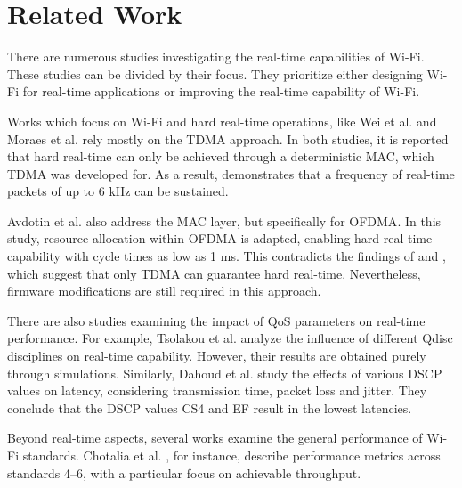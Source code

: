 \chapter{Related Work} \label{sec:related}

There are numerous studies investigating the real-time capabilities of Wi-Fi.  
These studies can be divided by their focus.
They prioritize either designing Wi-Fi for real-time applications or improving the real-time capability of Wi-Fi.

Works which focus on Wi-Fi and hard real-time operations, like Wei et al. \cite{6728869} and Moraes et al. \cite{4638758} rely mostly on the \ac{TDMA} approach.  
In both studies, it is reported that hard real-time can only be achieved through a deterministic \ac{MAC}, which \ac{TDMA} was developed for.  
As a result, \cite{6728869} demonstrates that a frequency of real-time packets of up to 6 kHz can be sustained.  

Avdotin et al. \cite{Avdotin_2019} also address the \ac{MAC} layer, but specifically for \ac{OFDMA}.  
In this study, resource allocation within \ac{OFDMA} is adapted, enabling hard real-time capability with cycle times as low as 1 ms.  
This contradicts the findings of \cite{6728869} and \cite{4638758}, which suggest that only \ac{TDMA} can guarantee hard real-time.  
Nevertheless, firmware modifications are still required in this approach.  

There are also studies examining the impact of \ac{QoS} parameters on real-time performance.  
For example, Tsolakou et al. \cite{Tsolakou_2002s} analyze the influence of different \ac{Qdisc} disciplines on real-time capability.  
However, their results are obtained purely through simulations.  
Similarly, Dahoud et al. \cite{da_2019} study the effects of various \ac{DSCP} values on latency, considering transmission time, packet loss and jitter.  
They conclude that the \ac{DSCP} values CS4 and EF result in the lowest latencies.  

Beyond real-time aspects, several works examine the general performance of Wi-Fi standards.  
Chotalia et al. \cite{10.1007/978-3-031-40564-8_14}, for instance, describe performance metrics across standards 4–6, with a particular focus on achievable throughput.  

